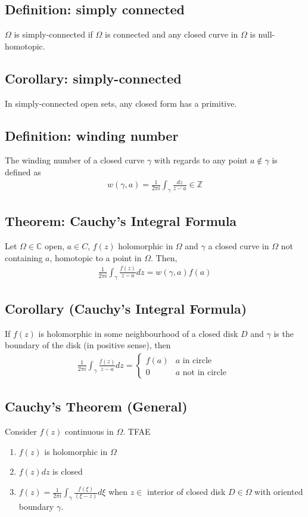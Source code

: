 \documentclass[11pt]{article}
\newcommand{\C}{\mathbb{C}}
\begin{document}
\subsection{Definition: simply connected} 
$\Omega$ is simply-connected if $\Omega$ is connected and any closed curve in $\Omega$ is null-homotopic. 

\subsection{Corollary: simply-connected}
In simply-connected open sets, any closed form has a primitive. 

\subsection{Definition: winding number} 
The winding number of a closed curve $\gamma$ with regards to any point $a \notin \gamma$ is defined as 
\begin{align*}
    w(\gamma, a) = \frac{1}{2\pi i } \int_\gamma \frac{dz}{z - a} \in \mathbb{Z}
\end{align*}

\subsection{Theorem: Cauchy's Integral Formula} 
Let $\Omega \in \C$ open, $a \in C$, $f(z)$ holomorphic in $\Omega$ and $\gamma$ a closed curve in $\Omega$ not containing $a$, homotopic to a point in $\Omega$. Then, 
\begin{align*}
    \frac{1}{2\pi i} \int_\gamma \frac{f(z)}{z-a}dz = w(\gamma, a) f(a)
\end{align*}

\subsection{Corollary (Cauchy's Integral Formula)}
If $f(z)$ is holomorphic in some neighbourhood of a closed disk $D$ and $\gamma$ is the boundary of the disk (in positive sense), then 
\begin{align*}
    \frac{1}{2\pi i} \int_\gamma \frac{f(z)}{z-a} dz = 
    \begin{cases}
        f(a) & a \text{ in circle}\\
        0 & a \text{ not in circle }
    \end{cases}
\end{align*}

\subsection{Cauchy's Theorem (General)}
Consider $f(z)$ continuous in $\Omega$. TFAE
\begin{enumerate}
    \item $f(z)$ is holomorphic in $\Omega$
    \item $f(z)dz$ is closed
    \item $f(z) = \frac{1}{2\pi i}\int_\gamma \frac{f(\xi)}{(\xi - z)}d \xi$ when $z \in$ interior of closed disk $D \in \Omega$ with oriented boundary $\gamma$. 
\end{enumerate}
\end{document}
